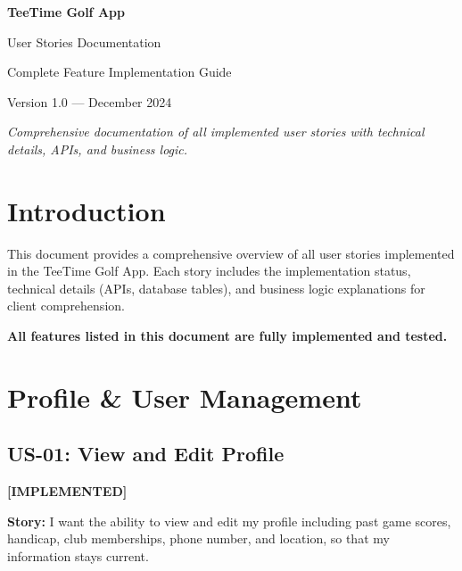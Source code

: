 \documentclass[11pt,a4paper]{article}
\newcommand{\implemented}{\textcolor{implemented}{\textbf{[IMPLEMENTED]}}}
\begin{document}
\begin{titlepage}
  \centering
  \vspace*{2cm}
  {\Huge\bfseries\color{primary} TeeTime Golf App\par}
  \vspace{1cm}
  {\LARGE User Stories Documentation\par}
  \vspace{2cm}
  {\Large Complete Feature Implementation Guide\par}
  \vspace{1cm}
  {\large Version 1.0 --- December 2024\par}
  \vfill
  {\large\textit{Comprehensive documentation of all implemented user stories with technical details, APIs, and business logic.}\par}
\end{titlepage}

\tableofcontents
\newpage

\section{Introduction}

This document provides a comprehensive overview of all user stories implemented in the TeeTime Golf App. Each story includes the implementation status, technical details (APIs, database tables), and business logic explanations for client comprehension.

\textbf{All features listed in this document are fully implemented and tested.}

\section{Profile \& User Management}

\subsection{US-01: View and Edit Profile}
\implemented

\textbf{Story:} I want the ability to view and edit my profile including past game scores, handicap, club memberships, phone number, and location, so that my information stays current.
\end{document}
